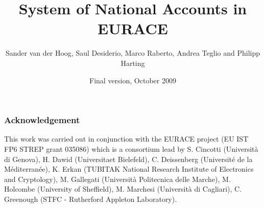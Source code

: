 \documentclass[a4paper]{article}
\begin{document}
\title{System of National Accounts in EURACE}
\author{Sander van der Hoog, Saul Desiderio, Marco Raberto, Andrea Teglio and Philipp Harting}
\date{Final version, October 2009}
\maketitle


\newpage
\tableofcontents

\subsubsection*{Acknowledgement}
This work was carried out in conjunction with the EURACE project (EU IST FP6
STREP grant 035086) which is a consortium lead by S. Cincotti (Universit\`{a} di
Genova), H. Dawid (Universitaet Bielefeld), C. Deissenberg (Universit\'{e} de la
M\'{e}diterran\'{e}e), K. Erkan (TUBITAK National Research Institute of Electronics
and Cryptology), M. Gallegati  (Universit\`{a} Politecnica delle Marche), M.
Holcombe (University of Sheffield), M. Marchesi (Universit\`{a} di Cagliari), C.
Greenough (STFC - Rutherford Appleton Laboratory).

\newpage






\end{document}
